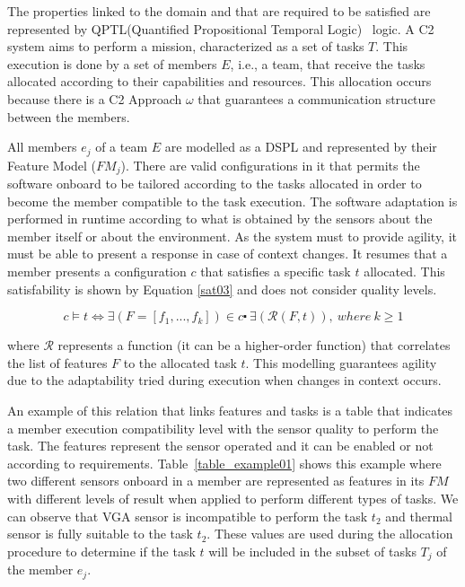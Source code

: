 The properties linked to the domain and that are required to be satisfied are represented by QPTL(Quantified Propositional Temporal Logic)~\cite{qptl01} logic. A C2 system aims to perform a mission, characterized as a set of tasks $T$. This execution is done by a set of members $E$, i.e., a team, that receive the tasks allocated according to their capabilities and resources. This allocation occurs because there is a C2 Approach $\omega$ that guarantees a communication structure between the members.

All members $e_j$ of a team $E$ are modelled as a DSPL and represented by their Feature Model ($FM_j$). There are valid configurations in it that permits the software onboard to be tailored according to the tasks allocated in order to become the member compatible to the task execution. The software adaptation is performed in runtime according to what is obtained by the sensors about the member itself or about the environment. As the system must to provide agility, it must be able to present a response in case of context changes. It resumes that a member presents a configuration $c$ that satisfies a specific task $t$ allocated. This satisfability is shown by Equation \ref{sat03} and does not consider quality levels.

\begin{center}
\begin{equation}
\label{sat03}
c \models t \Longleftrightarrow \exists (F=[f_1, ...,f_k]) \in c \centerdot \ \exists (\mathcal{R}(F, t)),\ where\ k \geq 1
\end{equation}
\end{center}

where $\mathcal{R}$ represents a function (it can be a higher-order function) that correlates the list of features $F$ to the allocated task $t$. This modelling guarantees agility due to the adaptability tried during execution when changes in context occurs.

An example of this relation that links features and tasks is a table that indicates a member execution compatibility level with the sensor quality to perform the task. The features represent the sensor operated and it can be enabled or not according to requirements. Table~\ref{table_example01} shows this example where two different sensors onboard in a member are represented as features in its $FM$ with different levels of result when applied to perform different types of tasks. We can observe that VGA sensor is incompatible to perform the task $t_2$ and thermal sensor is fully suitable to the task $t_2$. These values are used during the allocation procedure to determine if the task $t$ will be included in the subset of tasks $T_j$ of the member $e_j$.

